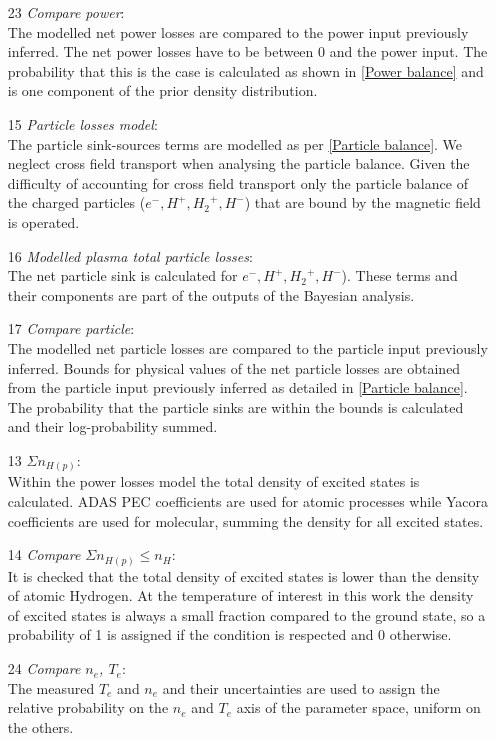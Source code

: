 \begin{enumerate}
    \item[23] \emph{Compare power}: \\The modelled net power losses are compared to the power input previously inferred. The net power losses have to be between 0 and the power input. The probability that this is the case is calculated as shown in \autoref{Power balance} and is one component of the prior density distribution.
    \item[15] \emph{Particle losses model}: \\The particle sink-sources terms are modelled as per \autoref{Particle balance}. We neglect cross field transport when analysing the particle balance. Given the difficulty of accounting for cross field transport only the particle balance of the charged particles ($e^-,H^+,{H_2}^+,H^-$) that are bound by the magnetic field is operated.
    \item[16] \emph{Modelled plasma total particle losses}: \\The net particle sink is calculated for $e^-,H^+,{H_2}^+,H^-$). These terms and their components are part of the outputs of the Bayesian analysis.
    \item[17] \emph{Compare particle}: \\The modelled net particle losses are compared to the particle input previously inferred. Bounds for physical values of the net particle losses are obtained from the particle input previously inferred as detailed in \autoref{Particle balance}. The probability that the particle sinks are within the bounds is calculated and their log-probability summed.
    \item[13] \emph{$\Sigma n_{H(p)}$}: \\Within the power losses model the total density of excited states is calculated. ADAS PEC coefficients are used for atomic processes while Yacora coefficients are used for molecular, summing the density for all excited states.
    \item[14] \emph{Compare $\Sigma n_{H(p)} \leq n_{H}$}: \\It is checked that the total density of excited states is lower than the density of atomic Hydrogen. At the temperature of interest in this work the density of excited states is always a small fraction compared to the ground state, so a probability of 1 is assigned if the condition is respected and 0 otherwise.   
    \item[24] \emph{Compare $n_e$, $T_e$}: \\The measured $T_e$ and $n_e$ and their uncertainties are used to assign the relative probability on the $n_e$ and $T_e$ axis of the parameter space, uniform on the others.

\end{enumerate}
